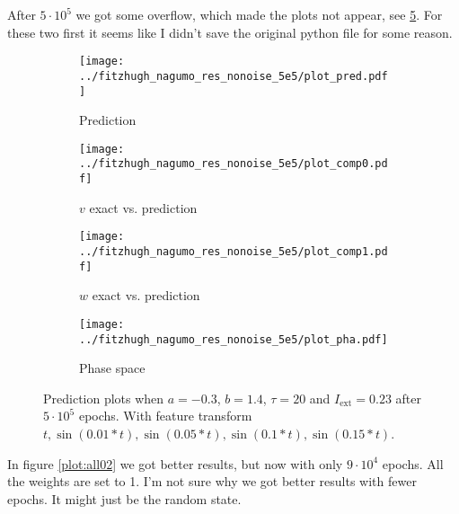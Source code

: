 \documentclass[a4paper]{article}
\begin{document}
After $5\cdot10^5$ we got some overflow, which made the plots not appear, see \ref{plot:all01}. For these two first it seems like	I didn't save the original python file for some reason.	

\begin{figure}[H]
	\centering 
	\begin{subfigure}[b]{0.47\textwidth}
		\centering
		\texttt{[image: ../fitzhugh\_nagumo\_res\_nonoise\_5e5/plot\_pred.pdf]}
		\caption{Prediction}
		\label{fig:all01a}
	\end{subfigure}
	\begin{subfigure}[b]{0.47\textwidth}
		\centering
		\texttt{[image: ../fitzhugh\_nagumo\_res\_nonoise\_5e5/plot\_comp0.pdf]}
		\caption{$v$ exact vs. prediction}
		\label{fig:all01b}
	\end{subfigure}
	\begin{subfigure}[b]{0.47\textwidth}
		\centering
		\texttt{[image: ../fitzhugh\_nagumo\_res\_nonoise\_5e5/plot\_comp1.pdf]}
		\caption{$w$ exact vs. prediction}
		\label{fig:all01c}
	\end{subfigure}
	\begin{subfigure}[b]{0.47\textwidth}
		\centering
		\texttt{[image: ../fitzhugh\_nagumo\_res\_nonoise\_5e5/plot\_pha.pdf]}
		\caption{Phase space}
		\label{fig:all01d}
	\end{subfigure}
	\caption{Prediction plots when $a=-0.3$, $b=1.4$, $\tau=20$ and $ I_{\text{ext}}=0.23$ after $5\cdot10^5$ epochs. With feature transform $t, \sin(0.01 * t), \sin(0.05 * t), \sin(0.1 * t), \sin(0.15 * t)$.}
	\label{plot:all01}
\end{figure} 	
	


In figure \ref{plot:all02} we got better results, but now with only $9\cdot10^4$ epochs. All the weights are set to 1. I'm not sure why we got better results with fewer epochs. It might just be the random state. 
\end{document}
